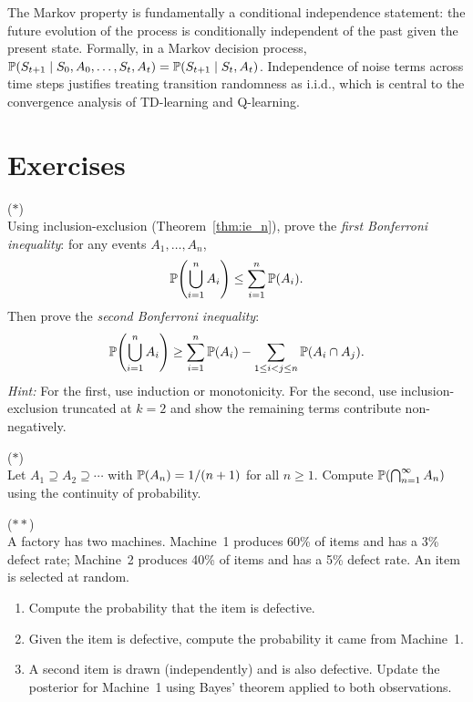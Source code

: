 \documentclass[11pt,a4paper]{article}
\begin{document}
\begin{rlconnection}[title={Independence and the Markov Property}]
The Markov property is fundamentally a conditional independence statement:
the future evolution of the process is conditionally independent of the
past given the present state. Formally, in a Markov decision process,
$\mathbb{P}(S_{t+1} \mid S_0, A_0, \ldots, S_t, A_t) = \mathbb{P}(S_{t+1} \mid S_t, A_t)$.
Independence of noise terms across time steps justifies treating
transition randomness as i.i.d., which is central to the convergence
analysis of TD-learning and Q-learning.
\end{rlconnection}


\section{Exercises}
\label{sec:exercises}

\begin{exercise}
\textnormal{(\(\ast\))} \\
Using inclusion-exclusion (Theorem~\ref{thm:ie_n}), prove the
\emph{first Bonferroni inequality}: for any events $A_1, \ldots, A_n$,
\[
    \mathbb{P}\!\left(\bigcup_{i=1}^n A_i\right)
    \leq \sum_{i=1}^n \mathbb{P}(A_i).
\]
Then prove the \emph{second Bonferroni inequality}:
\[
    \mathbb{P}\!\left(\bigcup_{i=1}^n A_i\right)
    \geq \sum_{i=1}^n \mathbb{P}(A_i)
    - \sum_{1 \leq i < j \leq n} \mathbb{P}(A_i \cap A_j).
\]
\textit{Hint:} For the first, use induction or monotonicity. For the
second, use inclusion-exclusion truncated at $k = 2$ and show the
remaining terms contribute non-negatively.
\end{exercise}

\begin{exercise}
\textnormal{(\(\ast\))} \\
Let $A_1 \supseteq A_2 \supseteq \cdots$ with
$\mathbb{P}(A_n) = 1/(n+1)$ for all $n \geq 1$. Compute
$\mathbb{P}\!\left(\bigcap_{n=1}^\infty A_n\right)$ using the continuity of
probability.
\end{exercise}

\begin{exercise}
\textnormal{(\(\ast\ast\))} \\
A factory has two machines. Machine~1 produces 60\% of items and has a
3\% defect rate; Machine~2 produces 40\% of items and has a 5\% defect
rate. An item is selected at random.
\begin{enumerate}[nosep,label=(\alph*)]
    \item Compute the probability that the item is defective.
    \item Given the item is defective, compute the probability it came
    from Machine~1.
    \item A second item is drawn (independently) and is also defective.
    Update the posterior for Machine~1 using Bayes' theorem applied
    to both observations.
\end{enumerate}
\end{exercise}
\end{document}
